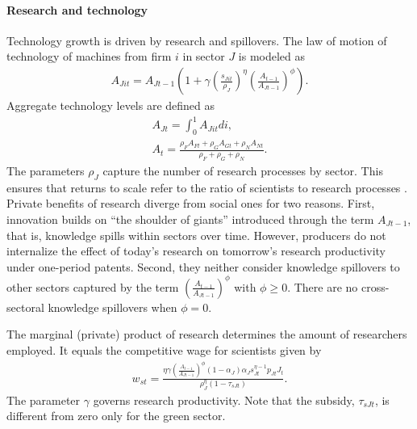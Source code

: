 \paragraph{Research and technology}
Technology growth is driven by research and spillovers. 
The law of motion of technology of machines from firm $i$ in sector $J$ is modeled as
\begin{align*}
	A_{Jit}=A_{Jt-1}\left(1+\gamma\left(\frac{s_{Jit}}{\rho_J}\right)^\eta\left(\frac{A_{t-1}}{A_{Jt-1}}\right)^\phi\right).
\end{align*}
Aggregate technology levels are defined as
\begin{align*}
	A_{Jt}=\int_{0}^{1}A_{Jit}di,\\
	A_{t}=\frac{\rho_FA_{Ft}+\rho_GA_{Gt}+\rho_N A_{Nt}}{\rho_F+\rho_G+\rho_N}.
\end{align*}
The parameters $\rho_J$ capture the number of research processes by sector. This ensures that returns to scale refer to the ratio of scientists to research processes \citep{Fried2018ClimateAnalysis}. 
Private benefits of research diverge from social ones for two reasons. First, innovation builds on ``the shoulder of giants'' introduced through the term $A_{Jt-1}$, that is, knowledge spills within sectors over time. However, producers do not internalize the effect of today's research on tomorrow's research productivity under one-period patents.  Second, they neither consider knowledge spillovers to other sectors captured by the term $\left(\frac{A_{t-1}}{A_{Jt-1}}\right)^\phi$ with $\phi\geq0$. There are no cross-sectoral knowledge spillovers when $\phi=0$.

The marginal (private) product of research determines the amount of researchers employed. It equals the competitive wage for scientists given by
\begin{align*}
	w_{st}= \frac{\eta \gamma \left(\frac{A_{t-1}}{A_{Jt-1}}\right)^\phi (1-\alpha_J)\alpha_Js_{Jt}^{\eta-1}p_{Jt}J_t}{\rho_J^\eta(1-\tau_{sJt})}.
\end{align*}
The parameter $\gamma$ governs research productivity. Note that the subsidy, $\tau_{sJt}$, is different from zero only for the green sector.


